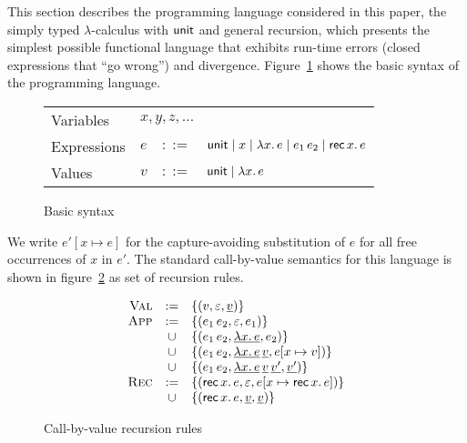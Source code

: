 \documentclass[12pt,a2paper,draft]{article}
\newcommand{\abstr}[2]{\ensuremath{\lambda{#1}.\,{#2}}}
\newcommand{\app}[2]{\ensuremath{{#1}\,{#2}}}
\newcommand{\rec}[2]{\ensuremath{{\normalfont\textsf{rec}}\,{#1}.\,{#2}}}
\newcommand{\unit}{\ensuremath{\normalfont\textsf{unit}}}
\begin{document}
This section describes the programming language considered in this paper,
the simply typed $\lambda$-calculus with $\unit$ and general recursion, which
presents the simplest possible functional language that exhibits run-time
errors (closed expressions that ``go wrong'') and divergence. Figure~\ref{fig:Basic_syntax}
shows the basic syntax of the programming language.

\begin{figure}[htb]
  \centering
  \begin{tabular}{llcl}
    Variables   & \multicolumn{3}{l}{$x,y,z,\ldots$} \\
    Expressions & $e$ & $::=$ & $\unit \mid x \mid \abstr{x}{e} \mid \app{e_1}{e_2} \mid \rec{x}{e}$ \\
    Values      & $v$ & $::=$ & $\unit \mid \abstr{x}{e}$
  \end{tabular}
  \caption{Basic syntax}
  \label{fig:Basic_syntax}
\end{figure}

We write $e'[x \mapsto e]$ for the capture-avoiding substitution of $e$ for all free occurrences
of $x$ in $e'$. The standard call-by-value semantics for this language is shown in
figure~\ref{fig:Call_by_value_recursion_rules} as set of recursion rules.

\begin{figure}[htb]
  \centering
  \[\begin{array}{rcl}
    \textsc{Val} &:=& \{(v,\varepsilon,\underline{v})\} \\
    \textsc{App} &:=& \{(\app{e_1}{e_2},\varepsilon,e_1)\} \\
                 &\cup& \{(\app{e_1}{e_2},\underline{\abstr{x}{e}},e_2)\} \\
                 &\cup& \{(\app{e_1}{e_2},\underline{\abstr{x}{e}}\,\underline{v},e[x \mapsto v])\} \\
                 &\cup& \{(\app{e_1}{e_2},\underline{\abstr{x}{e}}\,\underline{v}\,\underline{v'},\underline{v'})\} \\
    \textsc{Rec} &:=& \{(\rec{x}{e},\varepsilon,e[x \mapsto \rec{x}{e}])\} \\
                 &\cup& \{(\rec{x}{e},\underline{v},\underline{v})\}
  \end{array}\]
  \caption{Call-by-value recursion rules}
  \label{fig:Call_by_value_recursion_rules}
\end{figure}
\end{document}
